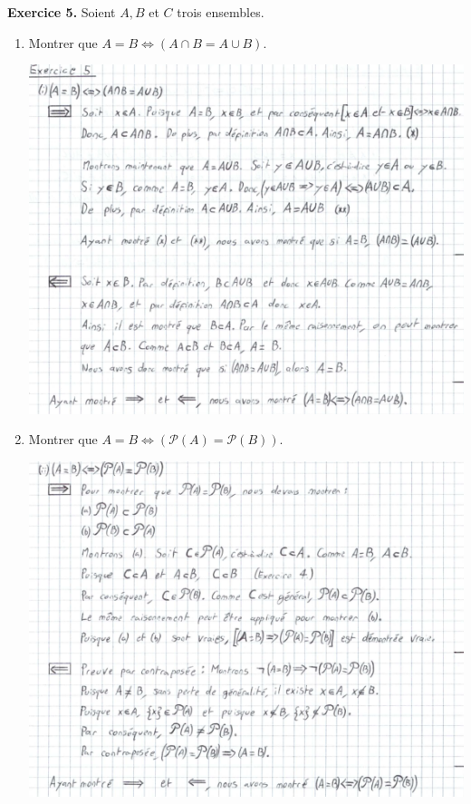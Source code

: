 \documentclass[a4paper, 10pt]{report}
\begin{document}
	\fancyhf{}
	\renewcommand{\headrule}
	{\rule{\textwidth}{0pt}}
	
	\noindent
	\textbf{Exercice 5.} Soient $A, B$ et $C$ trois ensembles.
	\begin{enumerate}[label=(\roman*)]
		\item Montrer que $A = B \iff (A \cap B = A \cup B)$.
		
		\includegraphics{ex05-1.png}
		
		\newpage
		\item Montrer que $A = B \iff
			(\mathcal{P}(A) = \mathcal{P}(B))$.
		
		\includegraphics{ex05-2.png}
		

\end{enumerate}
\end{document}
